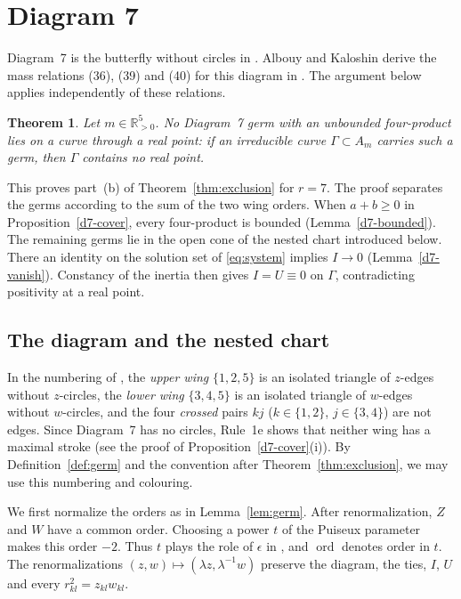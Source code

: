 \documentclass[11pt]{amsart}
\newtheorem{theorem}{Theorem}[section]
\theoremstyle{definition}
\theoremstyle{remark}
\newcommand{\Rp}{\mathbb{R}_{>0}}
\newcommand{\ord}{\operatorname{ord}}
\begin{document}
\section{Diagram 7}\label{sec:d7}

Diagram~7 is the butterfly without circles in \cite[\S7.4]{AK}.  Albouy and Kaloshin
derive the mass relations (36), (39) and (40) for this diagram in
\cite[\S\S8.7.1--8.7.3]{AK}.  The argument below applies independently of these relations.

\begin{theorem}\label{thm:d7}
Let $m\in\Rp^5$.  No Diagram~7 germ with an unbounded four-product lies on a curve through a
real point: if an irreducible curve $\Gamma\subset A_m$ carries such a germ, then $\Gamma$
contains no real point.
\end{theorem}

This proves part~(b) of Theorem~\ref{thm:exclusion} for $r=7$.  The proof separates the
germs according to the sum of the two wing orders.  When $a+b\ge0$ in
Proposition~\ref{d7-cover}, every four-product is bounded (Lemma~\ref{d7-bounded}).  The
remaining germs lie in the open cone of the nested chart introduced below.  There an
identity on the solution set of \eqref{eq:system} implies $I\to0$
(Lemma~\ref{d7-vanish}).  Constancy of the inertia then gives $I=U\equiv0$ on $\Gamma$,
contradicting positivity at a real point.

\subsection{The diagram and the nested chart}
In the numbering of \cite[\S8.7]{AK}, the \emph{upper wing} $\{1,2,5\}$ is an isolated triangle
of $z$-edges without $z$-circles, the \emph{lower wing} $\{3,4,5\}$ is an isolated triangle of
$w$-edges without $w$-circles, and the four \emph{crossed} pairs $kj$ ($k\in\{1,2\}$,
$j\in\{3,4\}$) are not edges.
Since Diagram~7 has no circles, Rule~1e shows that neither wing has a maximal stroke (see the
proof of Proposition~\ref{d7-cover}(i)).  By Definition~\ref{def:germ} and the convention after
Theorem~\ref{thm:exclusion}, we may use this numbering and colouring.

We first normalize the orders as in Lemma~\ref{lem:germ}.  After renormalization,
$Z$ and $W$ have a common order.  Choosing a power $t$ of the Puiseux parameter makes this
order $-2$.  Thus $t$ plays the role of $\epsilon$ in \cite[\S3]{AK}, and $\ord$ denotes
order in $t$.  The renormalizations $(z,w)\mapsto(\lambda z,\lambda^{-1}w)$ preserve the
diagram, the ties, $I$, $U$ and every $r_{kl}^2=z_{kl}w_{kl}$.
\end{document}
